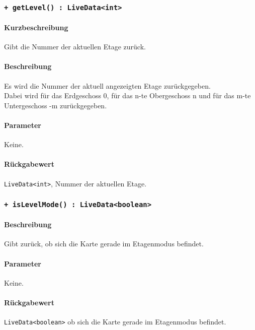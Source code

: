 \subsubsection*{\texttt{+ getLevel() : LiveData<int>}}%
\paragraph*{Kurzbeschreibung}
Gibt die Nummer der aktuellen Etage zurück.
\paragraph*{Beschreibung}
Es wird die Nummer der aktuell angezeigten Etage zurückgegeben.\\
Dabei wird für das Erdgeschoss 0, für das n-te Obergeschoss n und für das 
m-te Untergeschoss -m zurückgegeben.
\paragraph*{Parameter}
Keine.
\paragraph*{Rückgabewert}
\texttt{LiveData<int>}, Nummer der aktuellen Etage.

\subsubsection*{\texttt{+ isLevelMode() : LiveData<boolean>}}%
\paragraph*{Beschreibung}
Gibt zurück, ob sich die Karte gerade im Etagenmodus befindet.
\paragraph*{Parameter}
Keine.
\paragraph*{Rückgabewert}
\texttt{LiveData<boolean>} ob sich die Karte gerade im Etagenmodus befindet.
